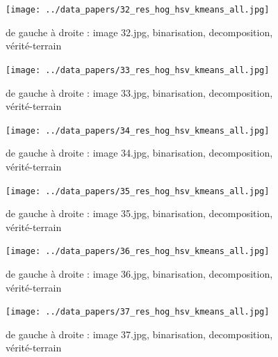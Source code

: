\documentclass{book}
\begin{document}
\begin{figure}[H]
\begin{center}
\texttt{[image: ../data\_papers/32\_res\_hog\_hsv\_kmeans\_all.jpg]}
\end{center}
\caption{de gauche à droite : image 32.jpg, binarisation, decomposition, vérité-terrain}
\label{32}
\end{figure}
\clearpage


\begin{figure}[H]
\begin{center}
\texttt{[image: ../data\_papers/33\_res\_hog\_hsv\_kmeans\_all.jpg]}
\end{center}
\caption{de gauche à droite : image 33.jpg, binarisation, decomposition, vérité-terrain}
\label{33}
\end{figure}
\clearpage


\begin{figure}[H]
\begin{center}
\texttt{[image: ../data\_papers/34\_res\_hog\_hsv\_kmeans\_all.jpg]}
\end{center}
\caption{de gauche à droite : image 34.jpg, binarisation, decomposition, vérité-terrain}
\label{34}
\end{figure}
\clearpage


\begin{figure}[H]
\begin{center}
\texttt{[image: ../data\_papers/35\_res\_hog\_hsv\_kmeans\_all.jpg]}
\end{center}
\caption{de gauche à droite : image 35.jpg, binarisation, decomposition, vérité-terrain}
\label{35}
\end{figure}
\clearpage


\begin{figure}[H]
\begin{center}
\texttt{[image: ../data\_papers/36\_res\_hog\_hsv\_kmeans\_all.jpg]}
\end{center}
\caption{de gauche à droite : image 36.jpg, binarisation, decomposition, vérité-terrain}
\label{36}
\end{figure}
\clearpage


\begin{figure}[H]
\begin{center}
\texttt{[image: ../data\_papers/37\_res\_hog\_hsv\_kmeans\_all.jpg]}
\end{center}
\caption{de gauche à droite : image 37.jpg, binarisation, decomposition, vérité-terrain}
\label{37}
\end{figure}
\clearpage
\end{document}
